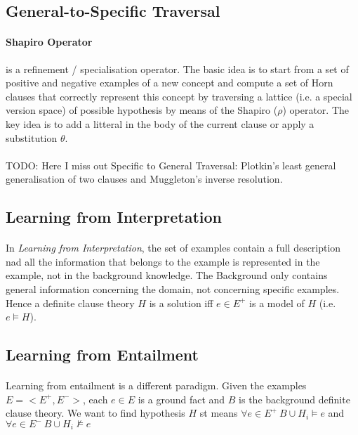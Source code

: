 \documentclass{article}
\theoremstyle{plain}
\theoremstyle{definition}
\begin{document}
\begin{multicols}{2}
\subsection{General-to-Specific Traversal}

\paragraph{Shapiro Operator} is a refinement / specialisation operator. The basic idea is to start from a set of positive and negative examples of a new concept and compute a set of Horn clauses that correctly represent this concept by traversing a lattice (i.e. a special version space) of possible hypothesis by means of the Shapiro ($\rho$) operator. The key idea is to add a litteral in the body of the current clause or apply a substitution $\theta$.

\paragraph{} TODO: Here I miss out Specific to General Traversal: Plotkin's least general generalisation of two clauses and Muggleton's inverse resolution.

\subsection{Learning from Interpretation}

\paragraph{} In \textit{Learning from Interpretation}, the set of examples contain a full description nad all the information that belongs to the example is represented in the example, not in the background knowledge. The Background only contains general information concerning the domain, not concerning specific examples. Hence a definite clause theory $H$ is a solution iff $e \in E^+$ is a model of $H$ (i.e. $e \models H$).

\subsection{Learning from Entailment}

\paragraph{} Learning from entailment is a different paradigm. Given the examples $E = <E^+, E^->$, each $e \in E$ is a ground fact and $B$ is the background definite clause theory. We want to find hypothesis $H$ st means $\forall e \in E^+\ B \cup H_i \models e$ and $\forall e \in E^-\ B \cup H_i \not\models e$


\end{multicols}
\end{document}
